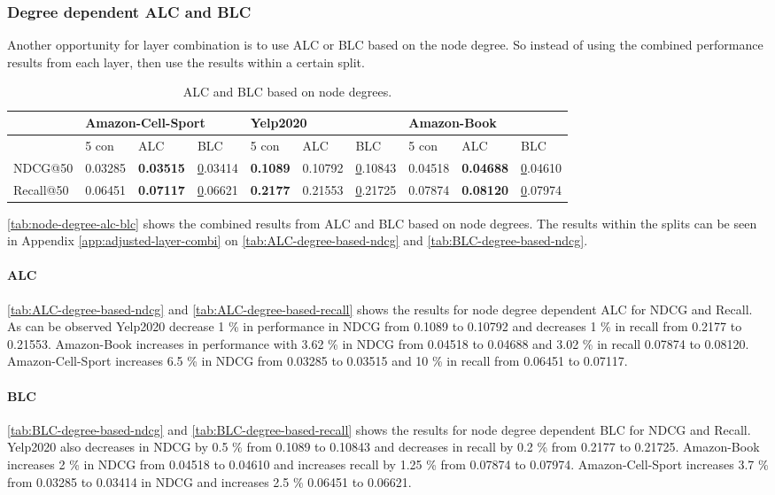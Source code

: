 \subsubsection{Degree dependent ALC and BLC}
Another opportunity for layer combination is to use ALC or BLC based on the node degree.
So instead of using the combined performance results from each layer, then use the results within a certain split.
\begin{table}[]
    \begin{tabular}{|l|l|l|l||l|l|l||l|l|l|}
    \hline
              & \multicolumn{3}{l||}{Amazon-Cell-Sport}     & \multicolumn{3}{l||}{Yelp2020}             & \multicolumn{3}{l|}{Amazon-Book}           \\ \hline
              & 5 con   & ALC              & BLC           & 5 con           & ALC     & BLC           & 5 con   & ALC              & BLC           \\ \hline
    NDCG@50   & 0.03285 & \textbf{0.03515} & {\ul 0.03414} & \textbf{0.1089} & 0.10792 & {\ul 0.10843} & 0.04518 & \textbf{0.04688} & {\ul 0.04610} \\ \hline
    Recall@50 & 0.06451 & \textbf{0.07117} & {\ul 0.06621} & \textbf{0.2177} & 0.21553 & {\ul 0.21725} & 0.07874 & \textbf{0.08120} & {\ul 0.07974} \\ \hline
    \end{tabular}
    \caption{ALC and BLC based on node degrees.}
    \label{tab:node-degree-alc-blc}
\end{table}
\autoref{tab:node-degree-alc-blc} shows the combined results from ALC and BLC based on node degrees.
The results within the splits can be seen in Appendix \autoref{app:adjusted-layer-combi} on \autoref{tab:ALC-degree-based-ndcg} and \autoref{tab:BLC-degree-based-ndcg}.
\paragraph{ALC}
\autoref{tab:ALC-degree-based-ndcg} and \autoref{tab:ALC-degree-based-recall} shows the results for node degree dependent ALC for NDCG and Recall.
As can be observed Yelp2020 decrease 1 \% in performance in NDCG from 0.1089 to 0.10792 and decreases 1 \% in recall from 0.2177 to 0.21553.
Amazon-Book increases in performance with 3.62 \% in NDCG from 0.04518 to 0.04688 and 3.02 \% in recall 0.07874 to 0.08120.
Amazon-Cell-Sport increases 6.5 \% in NDCG from 0.03285 to 0.03515 and 10 \% in recall from 0.06451 to 0.07117.
\paragraph{BLC}
\autoref{tab:BLC-degree-based-ndcg} and \autoref{tab:BLC-degree-based-recall} shows the results for node degree dependent BLC for NDCG and Recall.
Yelp2020 also decreases in NDCG by 0.5 \% from 0.1089 to 0.10843 and decreases in recall by 0.2 \% from 0.2177 to 0.21725.
Amazon-Book increases 2 \% in NDCG from 0.04518 to 0.04610 and increases recall by 1.25 \% from 0.07874 to 0.07974. 
Amazon-Cell-Sport increases 3.7 \% from 0.03285 to 0.03414 in NDCG and increases 2.5 \% 0.06451 to 0.06621.
